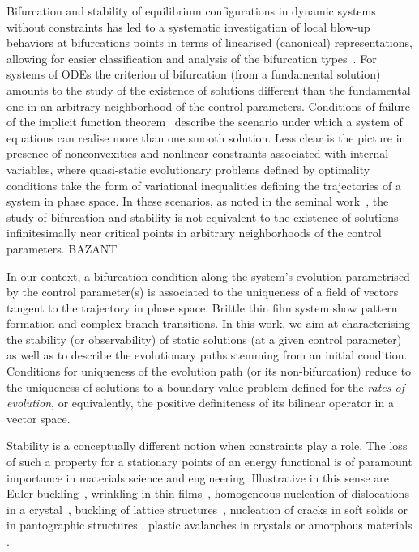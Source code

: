 Bifurcation and stability of equilibrium configurations in dynamic systems without constraints has led to a systematic investigation of local blow-up behaviors at bifurcations points in terms of linearised (canonical) representations, allowing for easier classification and analysis of the bifurcation types~\cite{}. 
For systems of ODEs the criterion  of bifurcation (from a fundamental solution) amounts to the study of the existence of solutions different than the fundamental one in an arbitrary neighborhood of the control parameters. Conditions of failure of the implicit function theorem~\cite{} describe the scenario under which a system of equations can realise more than one smooth solution.
Less clear is the picture in presence of nonconvexities and nonlinear constraints associated with internal variables, where quasi-static evolutionary problems defined by optimality conditions take the form of variational inequalities defining the trajectories of a system in phase space. In these scenarios, as noted in the seminal work~\cite{hill}, the study of bifurcation and stability is not equivalent to the existence of solutions infinitesimally near critical points in arbitrary neighborhoods of the control parameters.
BAZANT

In our context, 
a bifurcation condition along the system's evolution parametrised by the control parameter(s) is associated to the uniqueness of a field of vectors tangent to the trajectory in phase space.
Brittle thin film system show pattern formation and complex branch transitions. In this work, we aim at characterising the stability (or observability) of static solutions (at a given control parameter) as well as to describe the evolutionary paths stemming from an initial condition. Conditions for uniqueness of the evolution path (or its non-bifurcation) reduce to the uniqueness of solutions to a boundary value problem defined for the \emph{rates of evolution}, or equivalently, the positive definiteness of its bilinear operator in a vector space.

Stability is a conceptually different notion when constraints play a role.
The loss of such a property for a stationary points of an energy functional is of paramount importance in materials science and engineering. Illustrative in this sense are Euler buckling~\cite{Bettiol2020-ey}, wrinkling in thin films~\cite{Hutchinson2013-jk}, homogeneous nucleation of dislocations in a crystal~\cite{Carpio2005-bv,Plans2007-cx,Baggio2019-rs,Mayer2022-km,Baggio2023-qu}, buckling of lattice structures~\cite{Combescure2016-dy,Bertoldi2008-au}, nucleation of cracks in soft solids or in pantographic structures \cite{Riccobelli2023-fc,Salman2021-mn}, plastic  avalanches in crystals or amorphous materials \cite{Zhang2020-ax,Weiss2021-db,Yang2020-zm}.

